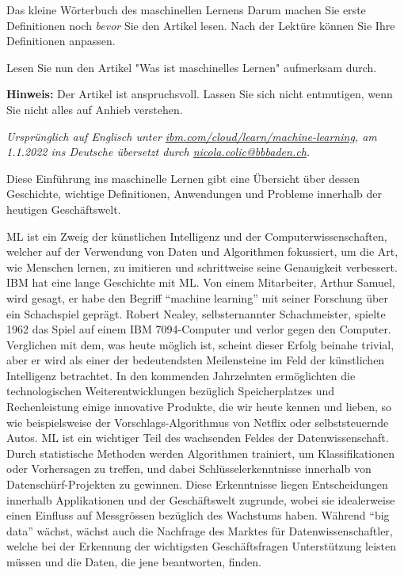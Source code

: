 \begin{lpu}{Das kleine Wörterbuch des maschinellen Lernens}
Darum machen Sie erste Definitionen noch \textit{bevor} Sie den Artikel lesen. Nach der Lektüre können Sie Ihre Definitionen anpassen.

\begin{aufgabe}{2}
Lesen Sie nun den Artikel "Was ist maschinelles Lernen" aufmerksam durch. 
\end{aufgabe}

\textbf{Hinweis:} Der Artikel ist anspruchsvoll. Lassen Sie sich nicht entmutigen, wenn Sie nicht alles auf Anhieb verstehen.

\begin{artikelbox}

\textit{Ursprünglich auf Englisch unter \href{https://www.ibm.com/cloud/learn/machine-learning}{\url{ibm.com/cloud/learn/machine-learning}}, am 1.1.2022 ins Deutsche übersetzt durch \url{nicola.colic@bbbaden.ch}.}

Diese Einführung ins maschinelle Lernen gibt eine Übersicht über dessen Geschichte, wichtige Definitionen, Anwendungen und Probleme innerhalb der heutigen Geschäftswelt.

ML ist ein Zweig der künstlichen Intelligenz und der Computerwissenschaften, welcher auf der Verwendung von Daten und Algorithmen fokussiert, um die Art, wie Menschen lernen, zu imitieren und schrittweise seine Genauigkeit verbessert.
IBM hat eine lange Geschichte mit ML. Von einem Mitarbeiter, Arthur Samuel, wird gesagt, er habe den Begriff ``machine learning'' mit seiner Forschung über ein Schachspiel geprägt. Robert Nealey, selbsternannter Schachmeister, spielte 1962 das Spiel auf einem IBM 7094-Computer und verlor gegen den Computer. Verglichen mit dem, was heute möglich ist, scheint dieser Erfolg beinahe trivial, aber er wird als einer der bedeutendsten Meilensteine im Feld der künstlichen Intelligenz betrachtet. In den kommenden Jahrzehnten ermöglichten die technologischen Weiterentwicklungen bezüglich Speicherplatzes und Rechenleistung einige innovative Produkte, die wir heute kennen und lieben, so wie beispielsweise der Vorschlags-Algorithmus von Netflix oder selbststeuernde Autos.
ML ist ein wichtiger Teil des wachsenden Feldes der Datenwissenschaft. Durch statistische Methoden werden Algorithmen trainiert, um Klassifikationen oder Vorhersagen zu treffen, und dabei Schlüsselerkenntnisse innerhalb von Datenschürf-Projekten zu gewinnen. Diese Erkenntnisse liegen Entscheidungen innerhalb Applikationen und der Geschäftswelt zugrunde, wobei sie idealerweise einen Einfluss auf Messgrössen bezüglich des Wachstums haben. Während ``big data'' wächst, wächst auch die Nachfrage des Marktes für Datenwissenschaftler, welche bei der Erkennung der wichtigsten Geschäftsfragen Unterstützung leisten müssen und die Daten, die jene beantworten, finden.


\end{artikelbox}
\end{lpu}
